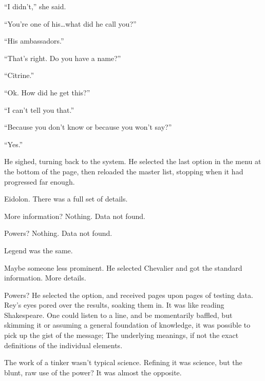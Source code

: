 ``I didn't,'' she said.



``You're one of his\ldots what did he call you?''



``His ambassadors.''



``That's right.  Do you have a name?''



``Citrine.''



``Ok.  How did he get this?''



``I can't tell you that.''



``Because you don't know or because you won't say?''



``Yes.''



He sighed, turning back to the system.  He selected the last option in the menu at the bottom of the page, then reloaded the master list, stopping when it had progressed far enough.



Eidolon.  There was a full set of details.



More information?  Nothing.  Data not found.



Powers?  Nothing.  Data not found.



Legend was the same.



Maybe someone less prominent.  He selected Chevalier and got the standard information.  More details.



Powers?  He selected the option, and received pages upon pages of testing data.  Rey's eyes pored over the results, soaking them in.  It was like reading Shakespeare.  One could listen to a line, and be momentarily baffled, but skimming it or assuming a general foundation of knowledge, it was possible to pick up the gist of the message;  The underlying meanings, if not the exact definitions of the individual elements.



The work of a tinker wasn't typical science.  Refining it was science, but the blunt, raw use of the power?  It was almost the opposite.



